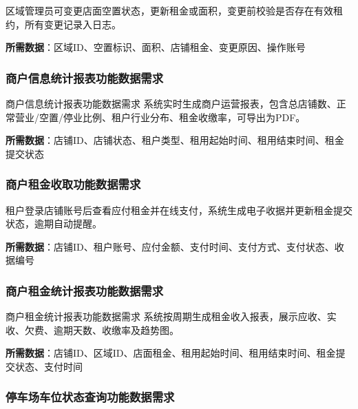 \documentclass[]{article}
\begin{document}
区域管理员可变更店面空置状态，更新租金或面积，变更前校验是否存在有效租约，所有变更记录入日志。

\textbf{所需数据}：区域ID、空置标识、面积、店铺租金、变更原因、操作账号

\hypertarget{ux5546ux6237ux4fe1ux606fux7edfux8ba1ux62a5ux8868ux529fux80fdux6570ux636eux9700ux6c42}{%
\subsubsection{商户信息统计报表功能数据需求}\label{ux5546ux6237ux4fe1ux606fux7edfux8ba1ux62a5ux8868ux529fux80fdux6570ux636eux9700ux6c42}}

商户信息统计报表功能数据需求
系统实时生成商户运营报表，包含总店铺数、正常营业/空置/停业比例、租户行业分布、租金收缴率，可导出为PDF。

\textbf{所需数据}：店铺ID、店铺状态、租户类型、租用起始时间、租用结束时间、租金提交状态

\hypertarget{ux5546ux6237ux79dfux91d1ux6536ux53d6ux529fux80fdux6570ux636eux9700ux6c42}{%
\subsubsection{商户租金收取功能数据需求}\label{ux5546ux6237ux79dfux91d1ux6536ux53d6ux529fux80fdux6570ux636eux9700ux6c42}}

租户登录店铺账号后查看应付租金并在线支付，系统生成电子收据并更新租金提交状态，逾期自动提醒。

\textbf{所需数据}：店铺ID、租户账号、应付金额、支付时间、支付方式、支付状态、收据编号

\hypertarget{ux5546ux6237ux79dfux91d1ux7edfux8ba1ux62a5ux8868ux529fux80fdux6570ux636eux9700ux6c42}{%
\subsubsection{商户租金统计报表功能数据需求}\label{ux5546ux6237ux79dfux91d1ux7edfux8ba1ux62a5ux8868ux529fux80fdux6570ux636eux9700ux6c42}}

商户租金统计报表功能数据需求
系统按周期生成租金收入报表，展示应收、实收、欠费、逾期天数、收缴率及趋势图。

\textbf{所需数据}：店铺ID、区域ID、店面租金、租用起始时间、租用结束时间、租金提交状态、支付时间

\hypertarget{ux505cux8f66ux573aux8f66ux4f4dux72b6ux6001ux67e5ux8be2ux529fux80fdux6570ux636eux9700ux6c42}{%
\subsubsection{停车场车位状态查询功能数据需求}\label{ux505cux8f66ux573aux8f66ux4f4dux72b6ux6001ux67e5ux8be2ux529fux80fdux6570ux636eux9700ux6c42}}
\end{document}
